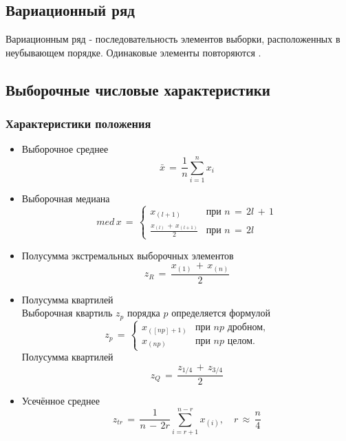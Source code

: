 \subsection{Вариационный ряд}
\begin{flushleft}
	Вариационным ряд - последовательность элементов выборки, расположенных в неубывающем порядке. Одинаковые элементы повторяются \cite[с.~409]{2}.
\end{flushleft}

\subsection{Выборочные числовые характеристики}
\subsubsection{Характеристики положения}
\begin{flushleft}
	\begin{itemize}
		\item Выборочное среднее
		\begin{equation}
			\label{8} \bar{x}\,=\,\frac{1}{n}\displaystyle\sum_{i=1}^{n} x_i
		\end{equation}
		\item Выборочная медиана
		\begin{equation}
			\label{9} med \, x \,=\,
			\begin{cases}
				x_{(l+1)} &\text{при $n \,=\,2l \,+\,1$}\\
				\frac{x_{(l)}\,+\,x_{(l+1)}}{2} &\text{при $n \,=\,2l$}
			\end{cases}
		\end{equation}
		\item Полусумма экстремальных выборочных элементов
		\begin{equation}
			\label{10} z_R \,=\,\frac{x_{(1)}\,+\, x_{(n)}}{2}
		\end{equation}
		\item Полусумма квартилей \\
		Выборочная квартиль $ z_p $ порядка $ p $ определяется формулой
		\begin{equation}
			\label{11} z_p \,=\,
			\begin{cases}
				x_{(\left[np\right]+1)} &\text{при $np$ дробном,}\\
				x_{(np)} &\text{при $np$ целом.}
			\end{cases}
		\end{equation}
		Полусумма квартилей
		\begin{equation}
			\label{12} z_Q \,=\,\frac{z_{1/4}\,+\, z_{3/4}}{2}
		\end{equation}
		\item Усечённое среднее
		\begin{equation}
			\label{13} z_{tr} \,=\,\frac{1}{n \,-\,2r}\displaystyle\sum_{i=r+1}^{n-r} x_{(i)},\quad r \,\approx\,\frac{n}{4}
		\end{equation}
	\end{itemize}
\end{flushleft}


